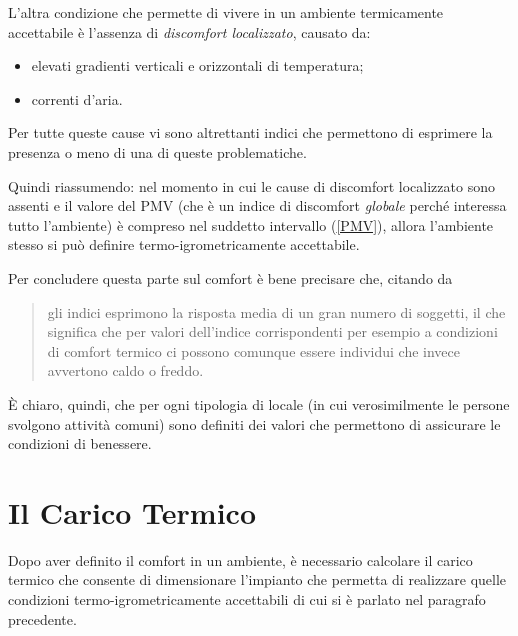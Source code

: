 L'altra condizione che permette di vivere in un ambiente termicamente accettabile è l'assenza di \emph{discomfort localizzato}, causato da:
\begin{itemize}
	\item elevati gradienti verticali e orizzontali di temperatura;
	\item correnti d'aria.
\end{itemize}
Per tutte queste cause vi sono altrettanti indici che permettono di esprimere la presenza o meno di una di queste problematiche.

Quindi riassumendo: nel momento in cui le cause di discomfort localizzato sono assenti e il valore del PMV (che è un indice di discomfort \emph{globale} perché interessa tutto l'ambiente) è compreso nel suddetto intervallo (\ref{PMV}), allora l'ambiente stesso si può definire termo-igrometricamente accettabile. 

Per concludere questa parte sul comfort è bene precisare che, citando da \cite[pag 31]{alfano}
\begin{quote}
	gli indici esprimono la risposta media di un gran numero di soggetti, il che significa che per valori dell'indice corrispondenti per esempio a condizioni di comfort termico ci possono comunque essere individui che invece avvertono caldo o freddo.
\end{quote} 
È chiaro, quindi, che per ogni tipologia di locale (in cui verosimilmente le persone svolgono attività comuni) sono definiti dei valori che permettono di assicurare le condizioni di benessere.
\section{Il Carico Termico}
Dopo aver definito il comfort in un ambiente, è necessario calcolare il carico termico che consente di dimensionare l'impianto che permetta di realizzare quelle condizioni termo-igrometricamente accettabili di cui si è parlato nel paragrafo precedente.

